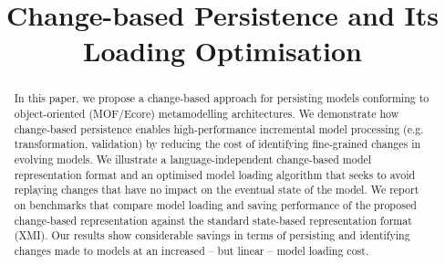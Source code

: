 \documentclass[sigconf]{acmart}
\begin{document}
\renewcommand{\thelstlisting}{\arabic{lstlisting}}
\renewcommand{\labelitemi}{$\bullet$}
\newcommand{\ts}{\textsuperscript}

\title{Change-based Persistence and Its Loading Optimisation}


%
%
%


\begin{abstract}
In this paper, we propose a change-based approach for persisting models conforming to object-oriented (MOF/Ecore) metamodelling architectures. We demonstrate how change-based persistence enables high-performance incremental model processing (e.g. transformation, validation) by reducing the cost of identifying fine-grained changes in evolving models. We illustrate a language-independent change-based model representation format and an optimised model loading algorithm that seeks to avoid replaying changes that have no impact on the eventual state of the model. We report on benchmarks that compare model loading and saving performance of the proposed change-based representation against the standard state-based representation format (XMI). Our results show considerable savings in terms of persisting and identifying changes made to models at an increased -- but linear -- model loading cost.

\end{abstract}
\end{document}
